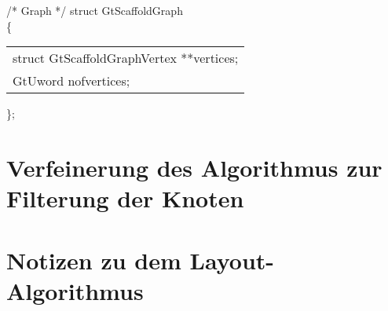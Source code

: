 \documentclass[a4paper,10pt,parskip]{scrartcl}
\begin{document}
/* Graph */
struct GtScaffoldGraph\\
\{\\
\begin{tabular}{l}
  struct GtScaffoldGraphVertex **vertices;\\
  GtUword nofvertices;
\end{tabular}
\};

\section{Verfeinerung des Algorithmus zur Filterung der Knoten}

\section{Notizen zu dem Layout-Algorithmus}
\end{document}
